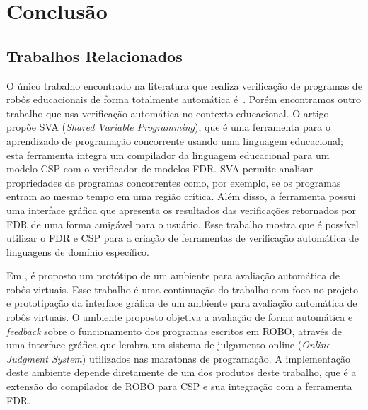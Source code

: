 \chapter{Conclusão}
\label{chap:cap5}

\section{Trabalhos Relacionados}

O único trabalho encontrado na literatura que realiza verificação de programas de robôs educacionais de forma totalmente automática é~\cite{nogueira}. Porém encontramos outro trabalho que usa verificação automática no contexto educacional. O artigo~\cite{SVA} propõe SVA (\textit{Shared Variable Programming}), que é uma ferramenta para o aprendizado de programação concorrente usando uma linguagem educacional; esta ferramenta integra um compilador da linguagem educacional para um modelo CSP com o verificador de modelos FDR. SVA permite analisar propriedades de programas concorrentes como, por exemplo, se os programas entram ao mesmo tempo em uma região crítica. Além disso, a ferramenta possui uma interface gráfica que apresenta os resultados das verificações retornados por FDR de uma forma amigável para o usuário. Esse trabalho mostra que é possível utilizar o FDR e CSP para a criação de ferramentas de verificação automática de linguagens de domínio específico. 

Em \cite{emanuel2017}, é proposto um protótipo de um ambiente para avaliação automática de robôs virtuais. Esse trabalho é uma continuação do trabalho \cite{nogueira} com foco no projeto e prototipação da interface gráfica de um ambiente para avaliação automática de robôs virtuais. O ambiente proposto objetiva a avaliação de forma automática e \textit{feedback} sobre o funcionamento dos programas escritos em ROBO, através de uma interface gráfica que lembra um sistema de julgamento online (\textit{Online Judgment System}) utilizados nas maratonas de programação. A implementação deste ambiente depende diretamente de um dos produtos deste trabalho, que é a extensão do compilador de ROBO para CSP e sua integração com a ferramenta FDR.

